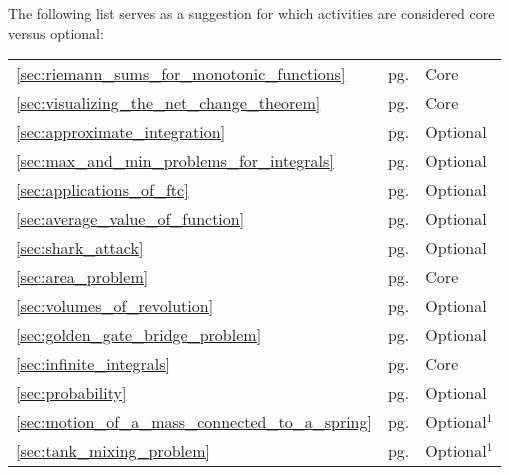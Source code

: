 \documentclass{tufte-book}
\begin{document}
The following list serves as a suggestion for which activities are considered core versus optional:
\begin{table}[h]
\begin{tabular}{lll}
\ref{sec:riemann_sums_for_monotonic_functions}
\nameref{sec:riemann_sums_for_monotonic_functions}			& pg. \pageref{sec:riemann_sums_for_monotonic_functions}		& Core\\
\ref{sec:visualizing_the_net_change_theorem}
\nameref{sec:visualizing_the_net_change_theorem}			& pg. \pageref{sec:visualizing_the_net_change_theorem}			& Core\\
\ref{sec:approximate_integration}
\nameref{sec:approximate_integration}						& pg. \pageref{sec:approximate_integration}						& Optional\\
\ref{sec:max_and_min_problems_for_integrals}
\nameref{sec:max_and_min_problems_for_integrals}			& pg. \pageref{sec:max_and_min_problems_for_integrals}			& Optional\\
\ref{sec:applications_of_ftc}
\nameref{sec:applications_of_ftc}							& pg. \pageref{sec:applications_of_ftc}							& Optional\\
\ref{sec:average_value_of_function}
\nameref{sec:average_value_of_function}						& pg. \pageref{sec:average_value_of_function}					& Optional\\
\ref{sec:shark_attack}
\nameref{sec:shark_attack}									& pg. \pageref{sec:shark_attack}								& Optional\\
\ref{sec:area_problem}
\nameref{sec:area_problem}									& pg. \pageref{sec:area_problem}								& Core\\
\ref{sec:volumes_of_revolution}
\nameref{sec:volumes_of_revolution}							& pg. \pageref{sec:volumes_of_revolution}						& Optional\\
\ref{sec:golden_gate_bridge_problem}
\nameref{sec:golden_gate_bridge_problem}					& pg. \pageref{sec:golden_gate_bridge_problem}					& Optional\\
\ref{sec:infinite_integrals}
\nameref{sec:infinite_integrals}							& pg. \pageref{sec:infinite_integrals}							& Core\\
\ref{sec:probability}
\nameref{sec:probability}									& pg. \pageref{sec:probability}									& Optional\\
\ref{sec:motion_of_a_mass_connected_to_a_spring}
\nameref{sec:motion_of_a_mass_connected_to_a_spring}		& pg. \pageref{sec:motion_of_a_mass_connected_to_a_spring}		& Optional$^1$\\
\ref{sec:tank_mixing_problem}
\nameref{sec:tank_mixing_problem}							& pg. \pageref{sec:tank_mixing_problem}							& Optional$^1$\\

\end{tabular}
\end{table}
\end{document}
